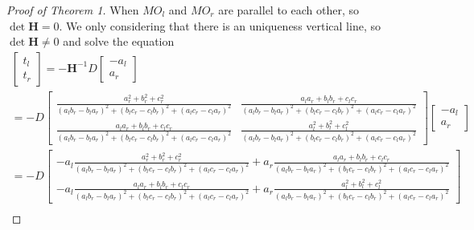 \documentclass[journal,article,submit,moreauthors,pdftex,10pt,a4paper]{mdpi}
\begin{document}
\begin{proof}[Proof of Theorem 1]
When $MO_l$ and $MO_r$ are parallel to each other, so $\det \mathbf{H} = 0$. We only considering that there is an uniqueness vertical line, so $\det \mathbf{H} \neq 0$ and solve the equation
\begin{equation} 
\begin{gathered}
\left[ {\begin{array}{*{20}{c}}
	{{t_l}} \\ 
	{{t_r}} 
	\end{array}} \right] =  - {{\mathbf{H}}^{ - 1}}D\left[ {\begin{array}{*{20}{c}}
	{ - {a_l}} \\ 
	{{a_r}} 
	\end{array}} \right] \\ 
=  - D\left[ {\begin{array}{*{20}{c}}
	{\frac{{a_r^2 + b_r^2 + c_r^2}}{{{{\left( {{a_l}{b_r} - {b_l}{a_r}} \right)}^2} + {{\left( {{b_l}{c_r} - {c_l}{b_r}} \right)}^2} + {{\left( {{a_l}{c_r} - {c_l}{a_r}} \right)}^2}}}}&{\frac{{{a_l}{a_r} + {b_l}{b_r} + {c_l}{c_r}}}{{{{\left( {{a_l}{b_r} - {b_l}{a_r}} \right)}^2} + {{\left( {{b_l}{c_r} - {c_l}{b_r}} \right)}^2} + {{\left( {{a_l}{c_r} - {c_l}{a_r}} \right)}^2}}}} \\ 
	{\frac{{{a_l}{a_r} + {b_l}{b_r} + {c_l}{c_r}}}{{{{\left( {{a_l}{b_r} - {b_l}{a_r}} \right)}^2} + {{\left( {{b_l}{c_r} - {c_l}{b_r}} \right)}^2} + {{\left( {{a_l}{c_r} - {c_l}{a_r}} \right)}^2}}}}&{\frac{{a_l^2 + b_l^2 + c_l^2}}{{{{\left( {{a_l}{b_r} - {b_l}{a_r}} \right)}^2} + {{\left( {{b_l}{c_r} - {c_l}{b_r}} \right)}^2} + {{\left( {{a_l}{c_r} - {c_l}{a_r}} \right)}^2}}}} 
	\end{array}} \right]\left[ {\begin{array}{*{20}{c}}
	{ - {a_l}} \\ 
	{{a_r}} 
	\end{array}} \right] \\ 
=  - D\left[ {\begin{array}{*{20}{c}}
	{ - {a_l}\frac{{a_r^2 + b_r^2 + c_r^2}}{{{{\left( {{a_l}{b_r} - {b_l}{a_r}} \right)}^2} + {{\left( {{b_l}{c_r} - {c_l}{b_r}} \right)}^2} + {{\left( {{a_l}{c_r} - {c_l}{a_r}} \right)}^2}}} + {a_r}\frac{{{a_l}{a_r} + {b_l}{b_r} + {c_l}{c_r}}}{{{{\left( {{a_l}{b_r} - {b_l}{a_r}} \right)}^2} + {{\left( {{b_l}{c_r} - {c_l}{b_r}} \right)}^2} + {{\left( {{a_l}{c_r} - {c_l}{a_r}} \right)}^2}}}} \\ 
	{ - {a_l}\frac{{{a_l}{a_r} + {b_l}{b_r} + {c_l}{c_r}}}{{{{\left( {{a_l}{b_r} - {b_l}{a_r}} \right)}^2} + {{\left( {{b_l}{c_r} - {c_l}{b_r}} \right)}^2} + {{\left( {{a_l}{c_r} - {c_l}{a_r}} \right)}^2}}} + {a_r}\frac{{a_l^2 + b_l^2 + c_l^2}}{{{{\left( {{a_l}{b_r} - {b_l}{a_r}} \right)}^2} + {{\left( {{b_l}{c_r} - {c_l}{b_r}} \right)}^2} + {{\left( {{a_l}{c_r} - {c_l}{a_r}} \right)}^2}}}} 
	\end{array}} \right] \\ 
\end{gathered}
\end{equation}


\end{proof}
\end{document}
